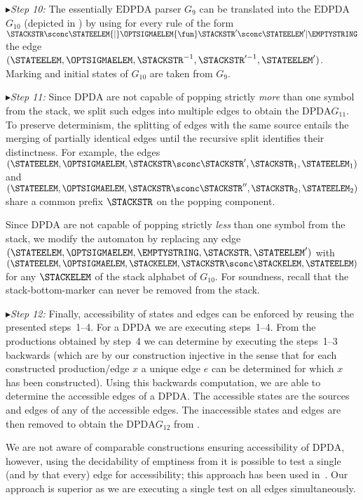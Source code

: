 \documentclass[draft]{ifacconf}
\newcommand{\STEP}[1]{\ensuremath{G_{#1}}\xspace}
\newcommand{\DPDA}{\ensuremath{\mathrm{DPDA}}\xspace}
\newcommand{\EDPDA}{\ensuremath{\mathrm{EDPDA}}\xspace}
\newcommand{\myparagraph}[1]{\par$\blacktriangleright$\emph{#1:}}
\newcommand{\RULE}[4]{#1 {\mid} #2 {\fun} #3 {\mid} #4}
\begin{document}
\myparagraph{Step 10}
The essentially \EDPDA parser \STEP{9} can be translated into the \EDPDA \STEP{10} (depicted in ) by using for every rule of the form $\RULE{\STACKSTR\sconc\STATEELEM}{\OPTSIGMAELEM}{\STACKSTR'\sconc\STATEELEM'}{\EMPTYSTRING}$ the edge $(\STATEELEM,\OPTSIGMAELEM,\STACKSTR^{-1},\STACKSTR'^{-1},\STATEELEM')$. Marking and initial states of \STEP{10} are taken from \STEP{9}.

\myparagraph{Step 11}
Since \DPDA are not capable of popping strictly \emph{more} than one symbol from the stack, we split such edges into multiple edges to obtain the \DPDA \STEP{11}. To preserve determinism, the splitting of edges with the same source entails the merging of partially identical edges until the recursive split identifies their distinctness. For example, the edges $(\STATEELEM,\OPTSIGMAELEM,\STACKSTR\sconc\STACKSTR',\STACKSTR_1,\STATEELEM_1)$ and $(\STATEELEM,\OPTSIGMAELEM,\STACKSTR\sconc\STACKSTR'',\STACKSTR_2,\STATEELEM_2)$ share a common prefix $\STACKSTR$ on the popping component.

Since \DPDA are not capable of popping strictly \emph{less} than one symbol from the stack, we modify the automaton by replacing any edge $(\STATEELEM,\OPTSIGMAELEM,\EMPTYSTRING,\STACKSTR,\STATEELEM')$ with $(\STATEELEM,\OPTSIGMAELEM,\STACKELEM,\STACKSTR\sconc\STACKELEM,\STATEELEM)$ for any $\STACKELEM$ of the stack alphabet of \STEP{10}. For soundness, recall that the stack-bottom-marker can never be removed from the stack.

\myparagraph{Step 12}
Finally, accessibility of states and edges can be enforced by reusing the presented steps~1--4.
For a \DPDA we are executing steps~1--4.
From the productions obtained by step~4 we can determine by executing the steps~1--3 backwards (which are by our construction injective in the sense that for each constructed production/edge $x$ a unique edge $e$ can be determined for which $x$ has been constructed).
Using this backwards computation, we are able to determine the accessible edges of a \DPDA.
The accessible states are the sources and edges of any of the accessible edges.
The inaccessible states and edges are then removed to obtain the \DPDA \STEP{12} from .

We are not aware of comparable constructions ensuring accessibility of \DPDA, however, using the decidability of emptiness from \cite{HopcroftUllman} it is possible to test a single (and by that every) edge for accessibility; this approach has been used in~\cite{Griffin2006}.
Our approach is superior as we are executing a single test on all edges simultaneously.
\end{document}
